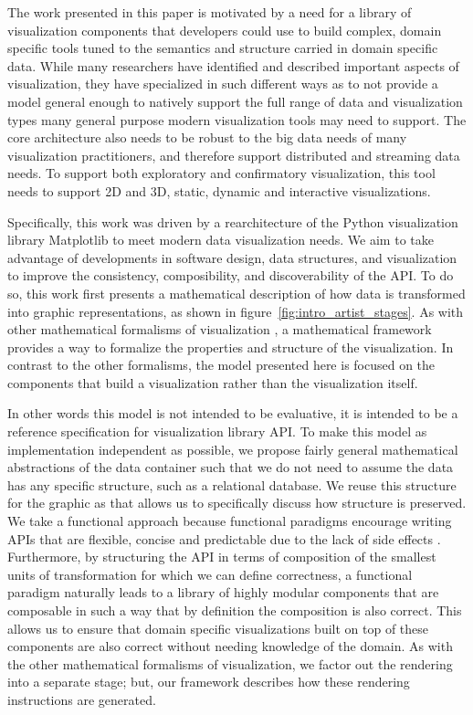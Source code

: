 \documentclass[../main.tex]{subfiles}
\begin{document}
The work presented in this paper is motivated by a need for a library of visualization components that developers could use to build complex, domain specific tools tuned to the semantics and structure carried in domain specific data. While many researchers have identified and described important aspects of visualization, they have specialized in such different ways as to not provide a model general enough to natively support the full range of data and visualization types many general purpose modern visualization tools may need to support. The core architecture also needs to be robust to the big data needs of many visualization practitioners, and therefore support distributed and streaming data needs. To support both exploratory and confirmatory visualization\cite{tukeyWeNeedBoth1980}, this tool needs to support 2D and 3D, static, dynamic and interactive visualizations. 

Specifically, this work was driven by a rearchitecture of the Python visualization library Matplotlib\cite{hunterMatplotlib2DGraphics2007} to meet modern data visualization needs. We aim to take advantage of developments in software design, data structures, and visualization to improve the consistency, composibility, and discoverability of the API. To do so, this work first presents a mathematical description of how data is transformed into graphic representations, as shown in figure~\ref{fig:intro_artist_stages}. As with other mathematical formalisms of visualization \cite{mackinlayAutomatingDesignGraphical1986,kindlmann2014algebraic,sugibuchiFramwork2009,vickersUnderstandingViz2013}, a mathematical framework provides a way to formalize the properties and structure of the visualization. In contrast to the other formalisms, the model presented here is focused on the components that build a visualization rather than the visualization itself. 

In other words this model is not intended to be evaluative, it is intended to be a reference specification for visualization library API. To make this model as implementation independent as possible, we propose fairly general mathematical abstractions of the data container such that we do not need to assume the data has any specific structure, such as a relational database. We reuse this structure for the graphic as that allows us to specifically discuss how structure is preserved. We take a functional approach because functional paradigms encourage writing APIs that are flexible, concise and predictable due to the lack of side effects \cite{loudenProgrammingLanguagesPrinciples2010}. Furthermore, by structuring the API in terms of composition of the smallest units of transformation for which we can define correctness, a functional paradigm naturally leads to a library of highly modular components that are composable in such a way that by definition the composition is also correct. This allows us to ensure that domain specific visualizations built on top of these components are also correct without needing knowledge of the domain. As with the other mathematical formalisms of visualization, we factor out the rendering into a separate stage; but, our framework describes how these rendering instructions are generated. 
\end{document}
